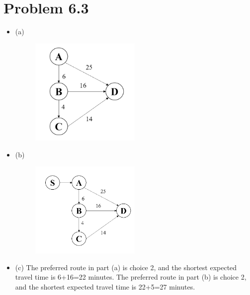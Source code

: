 \documentclass{article}
\theoremstyle{definition}
\theoremstyle{definition}
\theoremstyle{remark}
\begin{document}
\section*{Problem 6.3}
\begin{itemize}
	\item (a)
	\begin{figure}[H] %
		\centering %
		\includegraphics[width=0.5\textwidth]{1.png} %
	\end{figure}
 	\item (b) 
	 \begin{figure}[H] %
		\centering %
		\includegraphics[width=0.5\textwidth]{2.png} %
	\end{figure}
	\item (c) The preferred route in part (a) is choice 2, and the shortest 
	expected travel time is 6+16=22 minutes. The preferred route in part (b) 
	is choice 2, and the shortest expected travel time is 22+5=27 minutes.
	
\end{itemize}
\end{document}
